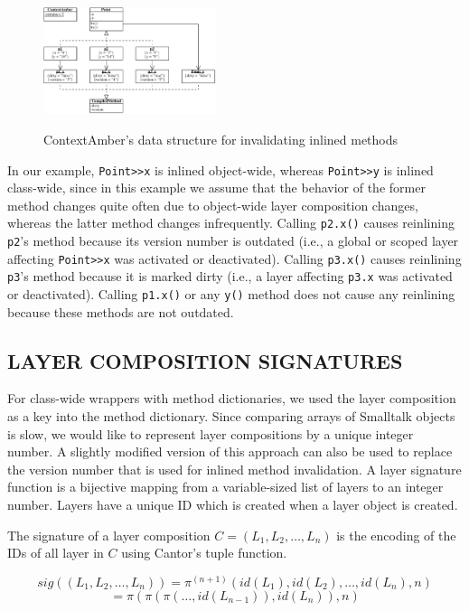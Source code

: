 \documentclass[english,paper=a4,twocolumn=true,DIV=calc,fontsize=9pt]{scrartcl}
\begin{document}
\begin{figure}[!htp]
    \centering
    \includegraphics[width=0.45\textwidth]{inlining_example.pdf}
    \label{fig:inlining-example}
    \caption{ContextAmber's data structure for invalidating inlined methods}
\end{figure}

In our example, \texttt{Point>>x} is inlined object-wide, whereas \texttt{Point>>y} is inlined class-wide, since in this example we assume that the behavior of the former method changes quite often due to object-wide layer composition changes, whereas the latter method changes infrequently. Calling \texttt{p2.x()} causes reinlining \texttt{p2}'s method because its version number is outdated (i.e., a global or scoped layer affecting \texttt{Point>>x} was activated or deactivated). Calling \texttt{p3.x()} causes reinlining \texttt{p3}'s method because it is marked dirty (i.e., a layer affecting \texttt{p3.x} was activated or deactivated). Calling \texttt{p1.x()} or any \texttt{y()} method does not cause any reinlining because these methods are not outdated.

\subsection{LAYER COMPOSITION SIGNATURES}
For class-wide wrappers with method dictionaries, we used the layer composition as a key into the method dictionary. Since comparing arrays of Smalltalk objects is slow, we would like to represent layer compositions by a unique integer number. A slightly modified version of this approach can also be used to replace the version number that is used for inlined method invalidation. A layer signature function is a bijective mapping from a variable-sized list of layers to an integer number. Layers have a unique ID which is created when a layer object is created.

The signature of a layer composition $C = (L_1, L_2, \dots, L_n)$ is the encoding of the IDs of all layer in $C$ using Cantor's tuple function.

$$\mathit{sig}((L_1, L_2, \ldots, L_n)) = \pi^{(n + 1)}(\mathit{id}(L_1), \mathit{id}(L_2), \ldots, \mathit{id}(L_n), n) $$
$$= \pi(\pi(\pi(\ldots, \mathit{id}(L_{n-1})), \mathit{id}(L_n)), n)$$
\end{document}
